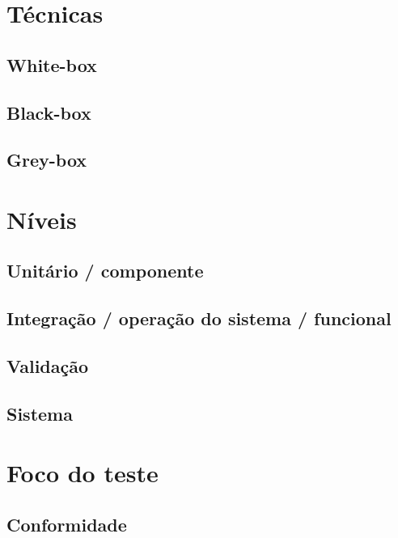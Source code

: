 \documentclass[
	12pt,				%
	openright,			%
	twoside,			%
	a4paper,			%
	english,			%
	brazil,				%
	]{abntex2}
\begin{document}
\section{Técnicas}


\subsection{White-box}


\subsection{Black-box}


\subsection{Grey-box}

\section{Níveis}


\subsection{Unitário / componente}


\subsection{Integração / operação do sistema / funcional}


\subsection{Validação}


\subsection{Sistema}

\section{Foco do teste}


\subsection{Conformidade}
\end{document}
